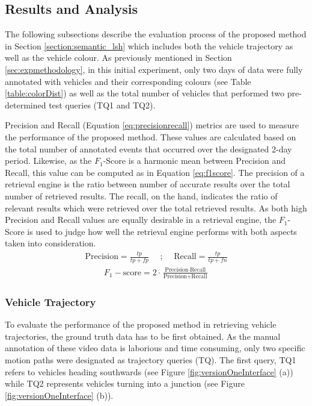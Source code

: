 \vspace{1em}
\subsection{Results and Analysis}
The following subsections describe the evaluation process of the proposed method in Section \ref{section:semantic_lsh} which includes both the vehicle trajectory as well as the vehicle colour. As previously mentioned in Section \ref{sec:expmethodology}, in this initial experiment, only two days of data were fully annotated with vehicles and their corresponding colours (see Table
\ref{table:colorDist}) as well as the total number of vehicles that performed two pre-determined test queries (TQ1 and TQ2).

Precision and Recall (Equation \ref{eq:precisionrecall}) metrics are used to measure the performance of the proposed method. These values are calculated based on the total number of annotated events that occurred over the designated 2-day period.
Likewise, as the $F_1$-Score is a harmonic mean between Precision and Recall, this value can be computed as in Equation \ref{eq:f1score}. The precision of a retrieval engine is the ratio between number of accurate results over the total number of retrieved results. The recall, on the hand, indicates the ratio of relevant results which were retrieved over the total retrieved results. As both high Precision and Recall values are equally desirable in a retrieval
engine, the $F_1$-Score is used to judge how well the retrieval engine performs with both aspects taken into consideration.
\begin{align}
\label{eq:precisionrecall}
    \text{Precision} = \frac{tp}{tp + fp}   \hspace{1em} \text{ ; }  \hspace{1em} \text{Recall}  = \frac{tp}{tp + fn}
\end{align}
\begin{align}
\label{eq:f1score}
F_{1}-\text{score}  = 2\cdot\frac{\text{Precision} \cdot \text{Recall}}{\text{Precision} + \text{Recall}}
\end{align}

\vspace{1em}
\subsubsection{Vehicle Trajectory}

To evaluate the performance of the proposed method in retrieving vehicle trajectories, the ground truth data has to be first obtained. As the manual annotation of these video data is laborious and time consuming, only two specific motion paths were designated as trajectory queries (TQ). The first query, TQ1 refers to vehicles heading southwards (see Figure
\ref{fig:versionOneInterface} (a)) while TQ2 represents vehicles turning into
a junction (see Figure \ref{fig:versionOneInterface} (b)).

